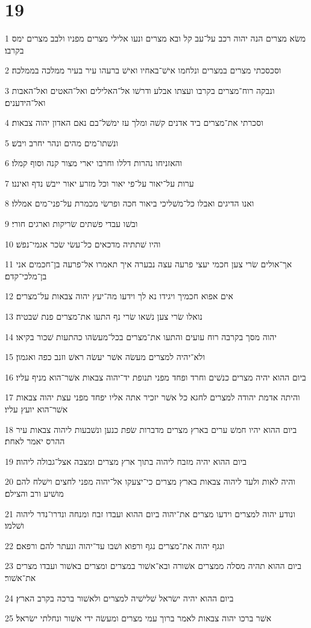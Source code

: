 \chapter{19}

\par 1 משׂא מצרים הנה יהוה רכב על־עב קל ובא מצרים ונעו אלילי מצרים מפניו ולבב מצרים ימס בקרבו׃
\par 2 וסכסכתי מצרים במצרים ונלחמו אישׁ־באחיו ואישׁ ברעהו עיר בעיר ממלכה בממלכה׃
\par 3 ונבקה רוח־מצרים בקרבו ועצתו אבלע ודרשׁו אל־האלילים ואל־האטים ואל־האבות ואל־הידענים׃
\par 4 וסכרתי את־מצרים ביד אדנים קשׁה ומלך עז ימשׁל־בם נאם האדון יהוה צבאות׃
\par 5 ונשׁתו־מים מהים ונהר יחרב ויבשׁ׃
\par 6 והאזניחו נהרות דללו וחרבו יארי מצור קנה וסוף קמלו׃
\par 7 ערות על־יאור על־פי יאור וכל מזרע יאור ייבשׁ נדף ואיננו׃
\par 8 ואנו הדיגים ואבלו כל־משׁליכי ביאור חכה ופרשׂי מכמרת על־פני־מים אמללו׃
\par 9 ובשׁו עבדי פשׁתים שׂריקות וארגים חורי׃
\par 10 והיו שׁתתיה מדכאים כל־עשׂי שׂכר אגמי־נפשׁ׃
\par 11 אך־אולים שׂרי צען חכמי יעצי פרעה עצה נבערה איך תאמרו אל־פרעה בן־חכמים אני בן־מלכי־קדם׃
\par 12 אים אפוא חכמיך ויגידו נא לך וידעו מה־יעץ יהוה צבאות על־מצרים׃
\par 13 נואלו שׂרי צען נשׁאו שׂרי נף התעו את־מצרים פנת שׁבטיה׃
\par 14 יהוה מסך בקרבה רוח עועים והתעו את־מצרים בכל־מעשׂהו כהתעות שׁכור בקיאו׃
\par 15 ולא־יהיה למצרים מעשׂה אשׁר יעשׂה ראשׁ וזנב כפה ואגמון׃
\par 16 ביום ההוא יהיה מצרים כנשׁים וחרד ופחד מפני תנופת יד־יהוה צבאות אשׁר־הוא מניף עליו׃
\par 17 והיתה אדמת יהודה למצרים לחגא כל אשׁר יזכיר אתה אליו יפחד מפני עצת יהוה צבאות אשׁר־הוא יועץ עליו׃
\par 18 ביום ההוא יהיו חמשׁ ערים בארץ מצרים מדברות שׂפת כנען ונשׁבעות ליהוה צבאות עיר ההרס יאמר לאחת׃
\par 19 ביום ההוא יהיה מזבח ליהוה בתוך ארץ מצרים ומצבה אצל־גבולה ליהוה׃
\par 20 והיה לאות ולעד ליהוה צבאות בארץ מצרים כי־יצעקו אל־יהוה מפני לחצים וישׁלח להם מושׁיע ורב והצילם׃
\par 21 ונודע יהוה למצרים וידעו מצרים את־יהוה ביום ההוא ועבדו זבח ומנחה ונדרו־נדר ליהוה ושׁלמו׃
\par 22 ונגף יהוה את־מצרים נגף ורפוא ושׁבו עד־יהוה ונעתר להם ורפאם׃
\par 23 ביום ההוא תהיה מסלה ממצרים אשׁורה ובא־אשׁור במצרים ומצרים באשׁור ועבדו מצרים את־אשׁור׃
\par 24 ביום ההוא יהיה ישׂראל שׁלישׁיה למצרים ולאשׁור ברכה בקרב הארץ׃
\par 25 אשׁר ברכו יהוה צבאות לאמר ברוך עמי מצרים ומעשׂה ידי אשׁור ונחלתי ישׂראל׃

